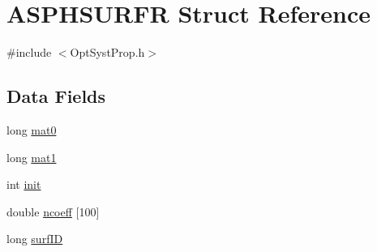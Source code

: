 \hypertarget{structASPHSURFR}{\section{A\+S\+P\+H\+S\+U\+R\+F\+R Struct Reference}
\label{structASPHSURFR}
}


{\ttfamily \#include $<$Opt\+Syst\+Prop.\+h$>$}

\subsection*{Data Fields}
\begin{DoxyCompactItemize}
\item 
long \hyperlink{structASPHSURFR_a9c6a2f637f66b2911129ec69640f98d2}{mat0}
\item 
long \hyperlink{structASPHSURFR_a0f31e31171389f94d70cc4ea0610e2a4}{mat1}
\item 
int \hyperlink{structASPHSURFR_ae2386c06994cf2b5a8090bbdee2a7957}{init}
\item 
double \hyperlink{structASPHSURFR_a06a64705ac7cbc0d7e54467d9b91c039}{ncoeff} \mbox{[}100\mbox{]}
\item 
long \hyperlink{structASPHSURFR_a1883e1812b5e228da6efc3fa85b88ff5}{surf\+I\+D}
\end{DoxyCompactItemize}



